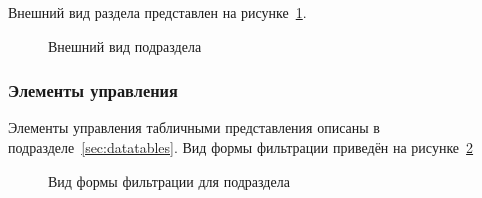 Внешний вид раздела представлен на рисунке~\ref{agreement:table_payments}.
		\begin{figure}[H]
		\caption{Внешний вид подраздела }
		\label{agreement:table_payments}
		\end{figure}	
		
\subsubsection{Элементы управления}
Элементы управления табличными представления описаны в подразделе~\ref{sec:datatables}. Вид формы фильтрации приведён на рисунке~\ref{agreement:payments_filter_form}
\begin{figure}[H]
	\caption{Вид формы фильтрации для подраздела }
	\label{agreement:payments_filter_form}
\end{figure}


